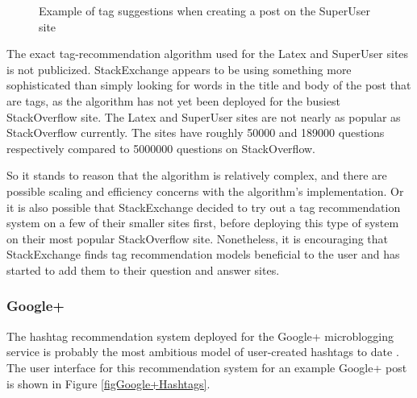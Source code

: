 \documentclass[man,floatsintext,donotrepeattitle]{apa6}
\begin{document}
\begin{figure}[!htbp]
  \caption{Example of tag suggestions when creating a post on the SuperUser site}
  \label{figSuperUserSuggestion}
\end{figure}

The exact tag-recommendation algorithm used for the Latex and SuperUser sites is not publicized.
StackExchange appears to be using something more sophisticated than simply looking for words in the title and body of the post that are tags, as the algorithm has not yet been deployed for the busiest StackOverflow site.
The Latex and SuperUser sites are not nearly as popular as StackOverflow currently.
The sites have roughly \num{50000} and \num{189000} questions respectively compared to \num{5000000} questions on StackOverflow.

So it stands to reason that the algorithm is relatively complex, and there are possible scaling and efficiency concerns with the algorithm's implementation.
Or it is also possible that StackExchange decided to try out a tag recommendation system on a few of their smaller sites first, before deploying this type of system on their most popular StackOverflow site.
Nonetheless, it is encouraging that StackExchange finds tag recommendation models beneficial to the user and has started to add them to their question and answer sites. 

\subsubsection{Google+}

The hashtag recommendation system deployed for the Google+ microblogging service is probably the most ambitious model of user-created hashtags to date \parencite{GoogleKeynote2013}.
The user interface for this recommendation system for an example Google+ post is shown in Figure \ref{figGoogle+Hashtags}.
\end{document}
